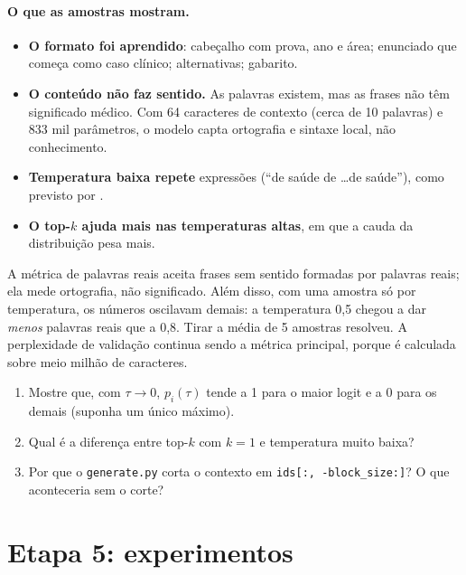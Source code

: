 \documentclass[11pt,a4paper]{article}
\begin{document}
\paragraph{O que as amostras mostram.}
\begin{itemize}
\item \textbf{O formato foi aprendido}: cabeçalho com prova, ano e área; enunciado que começa como caso clínico; alternativas; gabarito.
\item \textbf{O conteúdo não faz sentido.} As palavras existem, mas as frases não têm significado médico. Com 64 caracteres de contexto (cerca de 10 palavras) e 833 mil parâmetros, o modelo capta ortografia e sintaxe local, não conhecimento.
\item \textbf{Temperatura baixa repete} expressões (``de saúde de \dots de saúde''), como previsto por \cite{holtzman}.
\item \textbf{O top-$k$ ajuda mais nas temperaturas altas}, em que a cauda da distribuição pesa mais.
\end{itemize}

\begin{atencao}
A métrica de palavras reais aceita frases sem sentido formadas por palavras reais; ela mede ortografia, não significado. Além disso, com uma amostra só por temperatura, os números oscilavam demais: a temperatura 0,5 chegou a dar \emph{menos} palavras reais que a 0,8. Tirar a média de 5 amostras resolveu. A perplexidade de validação continua sendo a métrica principal, porque é calculada sobre meio milhão de caracteres.
\end{atencao}

\begin{exercicios}
\begin{enumerate}
\item Mostre que, com $\tau \to 0$, $p_i(\tau)$ tende a 1 para o maior logit e a 0 para os demais (suponha um único máximo).
\item Qual é a diferença entre top-$k$ com $k=1$ e temperatura muito baixa?
\item Por que o \texttt{generate.py} corta o contexto em \texttt{ids[:, -block\_size:]}? O que aconteceria sem o corte?
\end{enumerate}
\end{exercicios}

\section{Etapa 5: experimentos}
\label{sec:experimentos}
\end{document}

